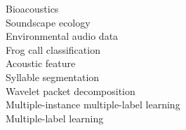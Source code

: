 \begin{abstract}
\end{abstract}



%



\begin{keywords}
Bioacoustics \\
Soundscape ecology\\
Environmental audio data \\
Frog call classification \\
Acoustic feature \\
Syllable segmentation\\
Wavelet packet decomposition \\
Multiple-instance multiple-label learning \\
Multiple-label learning \\
 
\end{keywords}






